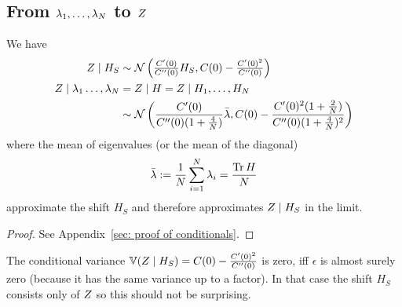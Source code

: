 \subsection{\texorpdfstring{From \(\lambda_1,\dots,\lambda_N\) to \(Z\)}{From λ1,...,λN to Z}}

\begin{theorem}
	\label{thm: conditional distributions of rf}
	We have
	\begin{align}
		Z\mid H_S
		&\sim \mathcal{N}\left(
			\tfrac{C'(0)}{C''(0)} H_S,
			C(0) - \tfrac{C'(0)^2}{C''(0)}
		\right)\\
		Z\mid \lambda_1\dots,\lambda_N
		&=Z\mid H = Z \mid H_1,\dots, H_N
		\nonumber\\
		&\sim \mathcal{N}\left(
		\frac{C'(0)}{C''(0)(1+\tfrac4{N})}\bar{\lambda},
		C(0)-\frac{C'(0)^2(1+\tfrac2{N})}{C''(0)(1+\tfrac4{N})^2}
	\right)
	\end{align}
	where the mean of eigenvalues (or the mean of the diagonal)
	\[
		\bar{\lambda}
		:=\frac1{N}\sum_{i=1}^N \lambda_i
		=\frac{\operatorname{Tr}{H}}{N}
	\]
	approximate the shift \(H_S\) and therefore approximates \(Z\mid H_S\) in
	the limit.
\end{theorem}
\begin{proof}
	See Appendix~\ref{sec: proof of conditionals}.
\end{proof}
\begin{remark}
	The conditional variance \(\mathbb{V}(Z\mid H_S)= C(0) -
	\tfrac{C'(0)^2}{C''(0)}\) is zero, iff \(\epsilon\) is almost surely
	zero (because it has the same variance up to a factor). In that case the
	shift \(H_S\) consists only of \(Z\) so this should not be surprising.
\end{remark}


